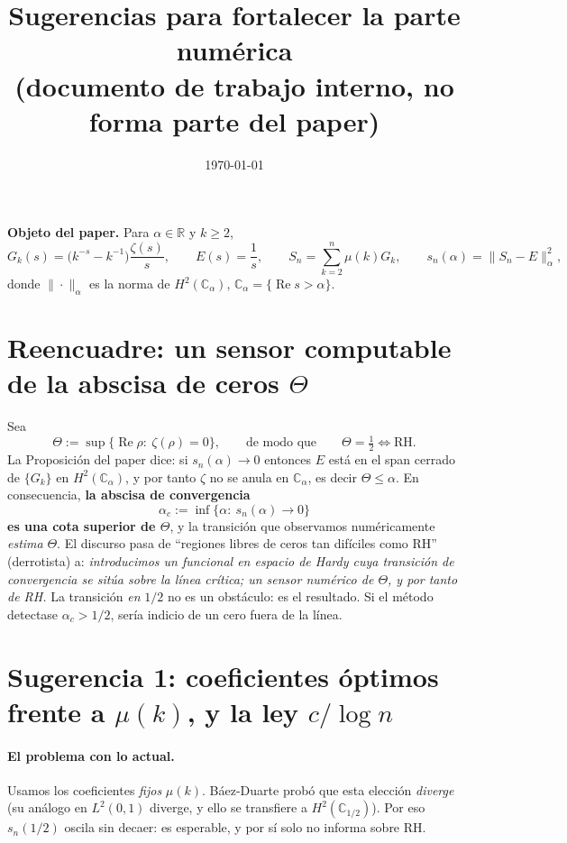 \documentclass[11pt]{article}
\title{Sugerencias para fortalecer la parte num\'erica\\
\large (documento de trabajo interno, no forma parte del paper)}
\author{}
\date{\today}
\newcommand{\R}{\mathbb{R}}
\newcommand{\C}{\mathbb{C}}
\newcommand{\Reop}{\operatorname{Re}}
\theoremstyle{plain}
\theoremstyle{definition}
\theoremstyle{remark}
\begin{document}
\maketitle

\noindent
\textbf{Objeto del paper.} Para $\alpha\in\R$ y $k\ge2$,
\[
G_k(s)=\bigl(k^{-s}-k^{-1}\bigr)\frac{\zeta(s)}{s},\qquad E(s)=\frac1s,\qquad
S_n=\sum_{k=2}^n\mu(k)G_k,\qquad s_n(\alpha)=\|S_n-E\|_\alpha^2,
\]
donde $\|\cdot\|_\alpha$ es la norma de $H^2(\C_\alpha)$, $\C_\alpha=\{\Reop s>\alpha\}$.

\bigskip

\section*{Reencuadre: un sensor computable de la abscisa de ceros $\Theta$}

Sea
\[
\Theta:=\sup\{\Reop\rho:\ \zeta(\rho)=0\}, \qquad\text{de modo que}\qquad \Theta=\tfrac12 \iff \text{RH}.
\]
La Proposici\'on del paper dice: si $s_n(\alpha)\to0$ entonces $E$ est\'a en el span cerrado de
$\{G_k\}$ en $H^2(\C_\alpha)$, y por tanto $\zeta$ no se anula en $\C_\alpha$, es decir
$\Theta\le\alpha$. En consecuencia, \textbf{la abscisa de convergencia}
\[
\alpha_c:=\inf\{\alpha:\ s_n(\alpha)\to0\}
\]
\textbf{es una cota superior de $\Theta$}, y la transici\'on que observamos num\'ericamente
\emph{estima} $\Theta$. El discurso pasa de ``regiones libres de ceros tan dif\'iciles como RH''
(derrotista) a: \emph{introducimos un funcional en espacio de Hardy cuya transici\'on de
convergencia se sit\'ua sobre la l\'inea cr\'itica; un sensor num\'erico de $\Theta$, y por tanto
de RH.} La transici\'on \emph{en} $1/2$ no es un obst\'aculo: es el resultado. Si el m\'etodo
detectase $\alpha_c>1/2$, ser\'ia indicio de un cero fuera de la l\'inea.

\bigskip

\section*{Sugerencia 1: coeficientes \'optimos frente a $\mu(k)$, y la ley $c/\log n$}

\paragraph{El problema con lo actual.} Usamos los coeficientes \emph{fijos} $\mu(k)$. B\'aez-Duarte
prob\'o que esta elecci\'on \emph{diverge} (su an\'alogo en $L^2(0,1)$ diverge, y ello se transfiere
a $H^2(\C_{1/2})$). Por eso $s_n(1/2)$ oscila sin decaer: es esperable, y por s\'i solo no informa
sobre RH.
\end{document}
